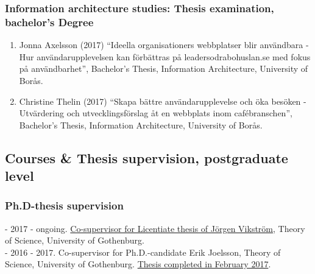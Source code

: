 \documentclass[a4paper,11pt,oneside]{article}
\begin{document}
             \subsubsection{Information architecture studies: Thesis examination, bachelor's Degree}
             \begin{enumerate}
              \item Jonna Axelsson (2017) ``Ideella organisationers webbplatser blir användbara - Hur användarupplevelsen kan förbättras på leadersodrabohuslan.se med fokus på användbarhet'', Bachelor's Thesis, Information Architecture, University of Borås.
              \item Christine Thelin (2017) ``Skapa bättre användarupplevelse och öka besöken - Utvärdering och utvecklingsförslag åt en webbplats inom cafébranschen'', Bachelor's Thesis, Information Architecture, University of Borås.
           \end{enumerate}


    \subsection{Courses \& Thesis supervision, postgraduate level}

    \subsubsection{Ph.D-thesis supervision}
    - 2017 - ongoing. \href{http://files.christopherkullenberg.se/Beslut%20byte%20handledare%20J%20Vikstrom.pdf}{Co-supervisor for Licentiate thesis of Jörgen Vikström}, Theory of Science, University of Gothenburg.\\
    - 2016 - 2017. Co-supervisor for Ph.D.-candidate Erik Joelsson, Theory of Science, University of Gothenburg. \href{https://gupea.ub.gu.se/handle/2077/51493}{Thesis completed in February 2017}.
\end{document}
